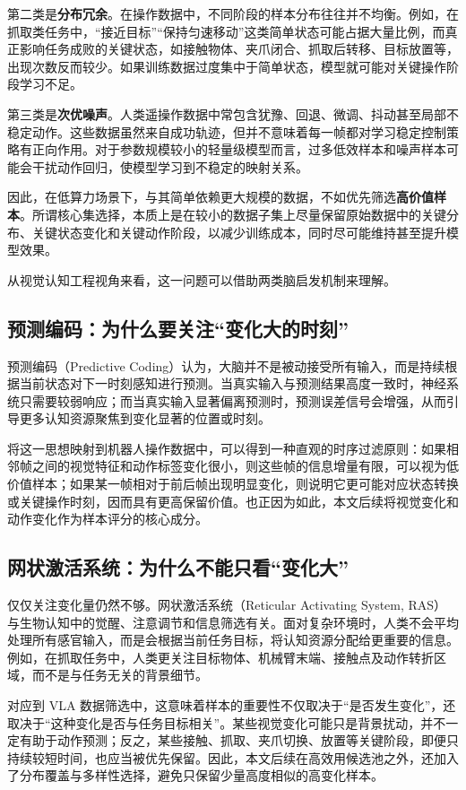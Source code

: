 \documentclass[UTF8,a4paper,12pt]{ctexart}
\begin{document}
第二类是\textbf{分布冗余}。在操作数据中，不同阶段的样本分布往往并不均衡。例如，在抓取类任务中，“接近目标”“保持匀速移动”这类简单状态可能占据大量比例，而真正影响任务成败的关键状态，如接触物体、夹爪闭合、抓取后转移、目标放置等，出现次数反而较少。如果训练数据过度集中于简单状态，模型就可能对关键操作阶段学习不足。

第三类是\textbf{次优噪声}。人类遥操作数据中常包含犹豫、回退、微调、抖动甚至局部不稳定动作。这些数据虽然来自成功轨迹，但并不意味着每一帧都对学习稳定控制策略有正向作用。对于参数规模较小的轻量级模型而言，过多低效样本和噪声样本可能会干扰动作回归，使模型学习到不稳定的映射关系。

因此，在低算力场景下，与其简单依赖更大规模的数据，不如优先筛选\textbf{高价值样本}。所谓核心集选择，本质上是在较小的数据子集上尽量保留原始数据中的关键分布、关键状态变化和关键动作阶段，以减少训练成本，同时尽可能维持甚至提升模型效果。

从视觉认知工程视角来看，这一问题可以借助两类脑启发机制来理解。

\subsection{预测编码：为什么要关注“变化大的时刻”}

预测编码（Predictive Coding）认为，大脑并不是被动接受所有输入，而是持续根据当前状态对下一时刻感知进行预测。当真实输入与预测结果高度一致时，神经系统只需要较弱响应；而当真实输入显著偏离预测时，预测误差信号会增强，从而引导更多认知资源聚焦到变化显著的位置或时刻。

将这一思想映射到机器人操作数据中，可以得到一种直观的时序过滤原则：如果相邻帧之间的视觉特征和动作标签变化很小，则这些帧的信息增量有限，可以视为低价值样本；如果某一帧相对于前后帧出现明显变化，则说明它更可能对应状态转换或关键操作时刻，因而具有更高保留价值。也正因为如此，本文后续将视觉变化和动作变化作为样本评分的核心成分。

\subsection{网状激活系统：为什么不能只看“变化大”}

仅仅关注变化量仍然不够。网状激活系统（Reticular Activating System, RAS）与生物认知中的觉醒、注意调节和信息筛选有关。面对复杂环境时，人类不会平均处理所有感官输入，而是会根据当前任务目标，将认知资源分配给更重要的信息。例如，在抓取任务中，人类更关注目标物体、机械臂末端、接触点及动作转折区域，而不是与任务无关的背景细节。

对应到 VLA 数据筛选中，这意味着样本的重要性不仅取决于“是否发生变化”，还取决于“这种变化是否与任务目标相关”。某些视觉变化可能只是背景扰动，并不一定有助于动作预测；反之，某些接触、抓取、夹爪切换、放置等关键阶段，即便只持续较短时间，也应当被优先保留。因此，本文后续在高效用候选池之外，还加入了分布覆盖与多样性选择，避免只保留少量高度相似的高变化样本。
\end{document}
